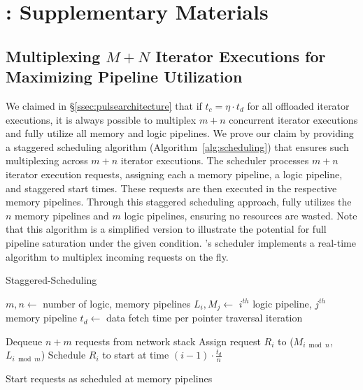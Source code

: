 
\chapter{\pulse: Supplementary Materials}


\section{Multiplexing $M+N$ Iterator Executions for Maximizing Pipeline Utilization}

We claimed in \S\ref{ssec:pulsearchitecture} that if $t_c = \eta \cdot t_d$ for all offloaded iterator executions, it is always possible to multiplex $m + n$ concurrent iterator executions and fully utilize all memory and logic pipelines. We prove our claim by providing a staggered scheduling algorithm (Algorithm~\ref{alg:scheduling}) that ensures such multiplexing across $m+n$ iterator executions. The scheduler processes $m+n$ iterator execution requests, assigning each a memory pipeline, a logic pipeline, and staggered start times. These requests are then executed in the respective memory pipelines. Through this staggered scheduling approach, \jiffy fully utilizes the $n$ memory pipelines and $m$ logic pipelines, ensuring no resources are wasted. Note that this algorithm is a simplified version to illustrate the potential for full pipeline saturation under the given condition. \jiffy's scheduler implements a real-time algorithm to multiplex incoming requests on the fly.


\begin{algorithm}
\caption{Staggered-Scheduling}
\label{alg:scheduling}
\begin{algorithmic}[1]
\State $m, n \gets$ number of logic, memory pipelines
\State $L_i, M_j \gets$ $i^{th}$ logic pipeline, $j^{th}$ memory pipeline
\State $t_d \gets$ data fetch time per pointer traversal iteration

    \State Dequeue $n + m$ requests from network stack
        \State Assign request $R_i$ to ($M_{i \bmod n}$,  $L_{i \bmod m}$)
        \State Schedule $R_i$ to start at time $(i-1) \cdot \frac{t_d}{n}$
        
        
    \EndFor
    
    \State Start requests as scheduled at memory pipelines
    
\EndWhile
\end{algorithmic}
\end{algorithm}



